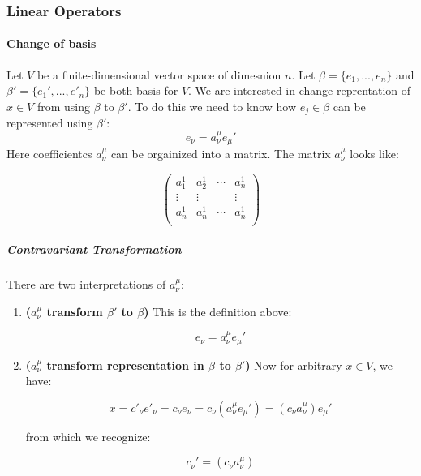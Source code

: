 \subsubsection{Linear Operators}

%
\providecommand{\argmin}{\operatorname*{arg\,min}}%
\providecommand{\argmax}{\operatorname*{arg\,max}}%
\paragraph{Change of basis}

Let $V$ be a finite-dimensional vector space of dimesnion $n$. Let $\beta=\{e_1,...,e_n\}$ and $\beta'=\{e_1',...,e'_n\}$ be both basis for $V$. We are interested in change reprentation of $x\in V$ from using $\beta$ to $\beta'$. To do this we need to know how $e_j\in \beta$ can be represented using $\beta'$:
\begin{equation}
e_\nu = a_{\nu}^{\mu} e_{\mu}'
\end{equation}
Here coefficientcs $a_{\nu}^{\mu}$ can be orgainized into a matrix. The matrix $a_{\nu}^{\mu}$ looks like:

\begin{equation}
\begin{pmatrix}
a_1^1 & a_2^1 & \cdots & a_n^1\\
\vdots &\vdots  & &\vdots\\
a_n^1 & a_n^1 & \cdots & a_n^1\\
\end{pmatrix}
\end{equation}

\subparagraph{Contravariant Transformation}

There are two interpretations of $a_{\nu}^{\mu}$:

\begin{enumerate}
\item \textbf{($a_{\nu}^{\mu}$ transform $\beta'$ to $\beta$)} This is the definition above:

\begin{equation}
e_\nu = a_{\nu}^{\mu} e_{\mu}'
\end{equation}


\item \textbf{($a_{\nu}^{\mu}$ transform representation in $\beta$ to $\beta'$)}
Now for arbitrary $x\in V$, we have:

\begin{equation}
x=c'_{\nu}e'_{\nu}=c_{\nu}e_{\nu} =c_\nu (a_{\nu}^{\mu} e_{\mu}' )=(c_\nu a_{\nu}^{\mu}) e_{\mu}'
\end{equation}


from which we recognize:

\begin{equation}
c_{\nu}'=(c_{\nu}a_{\nu}^{\mu})
\end{equation}
\end{enumerate}

